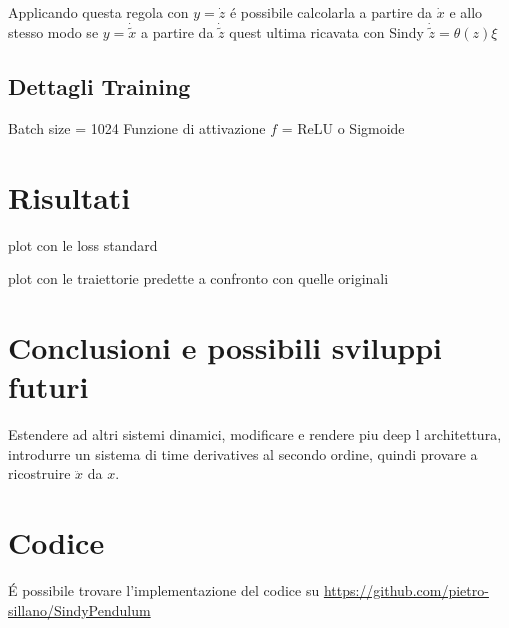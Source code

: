 \documentclass[11pt]{article}
\begin{document}
Applicando questa regola con $y = \dot{z} $ é possibile calcolarla a partire da $\dot{x}$ e allo stesso modo se $y = \dot{\tilde{x}}$ a partire da $\dot{\tilde{z}}$ quest ultima ricavata con Sindy $\dot{\tilde{z}} = \theta(z)\xi$

\subsection{Dettagli Training}
Batch size = 1024
Funzione di attivazione $f$ = ReLU o Sigmoide

\section{Risultati}
plot con le loss standard

plot con le traiettorie predette a confronto con quelle originali


\section{Conclusioni e possibili sviluppi futuri}
Estendere ad altri sistemi dinamici,
modificare e rendere piu deep l architettura,
introdurre un sistema di time derivatives al secondo ordine, quindi provare a ricostruire $\ddot{x}$ da  $x$.






\section{Codice}
É possibile trovare l'implementazione del codice su \url{https://github.com/pietro-sillano/SindyPendulum}
\end{document}
